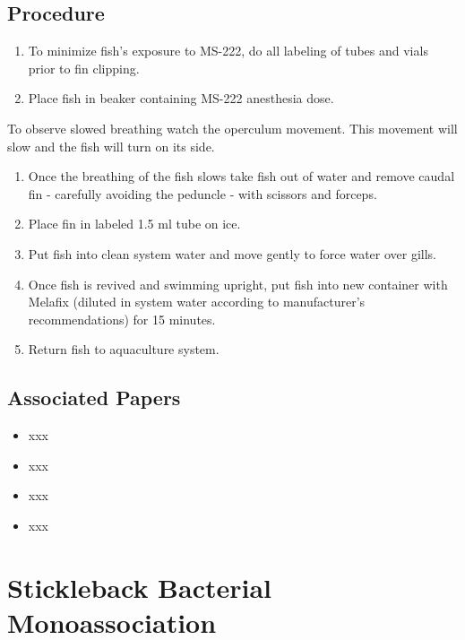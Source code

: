 \documentclass[
  letterpaper,
  DIV=11,
  numbers=noendperiod]{scrreprt}
\providecommand{\tightlist}{%
  \setlength{\itemsep}{0pt}\setlength{\parskip}{0pt}}\usepackage{longtable,booktabs,array}
\begin{document}
\hypertarget{procedure-52}{%
\section{Procedure}\label{procedure-52}}

\begin{enumerate}
\def\labelenumi{\arabic{enumi}.}
\tightlist
\item
  To minimize fish's exposure to MS-222, do all labeling of tubes and
  vials prior to fin clipping.
\item
  Place fish in beaker containing MS-222 anesthesia dose.
\end{enumerate}

To observe slowed breathing watch the operculum movement. This movement
will slow and the fish will turn on its side.

\begin{enumerate}
\def\labelenumi{\arabic{enumi}.}
\setcounter{enumi}{2}
\tightlist
\item
  Once the breathing of the fish slows take fish out of water and remove
  caudal fin - carefully avoiding the peduncle - with scissors and
  forceps.
\item
  Place fin in labeled 1.5 ml tube on ice.
\item
  Put fish into clean system water and move gently to force water over
  gills.
\item
  Once fish is revived and swimming upright, put fish into new container
  with Melafix (diluted in system water according to manufacturer's
  recommendations) for 15 minutes.
\item
  Return fish to aquaculture system.
\end{enumerate}

\hypertarget{associated-papers-35}{%
\section{Associated Papers}\label{associated-papers-35}}

\begin{itemize}
\tightlist
\item
  xxx
\item
  xxx
\item
  xxx
\item
  xxx
\end{itemize}

\hypertarget{sec-vert_exp_mono_ass_SB}{%
\chapter{Stickleback Bacterial
Monoassociation}\label{sec-vert_exp_mono_ass_SB}}
\end{document}
